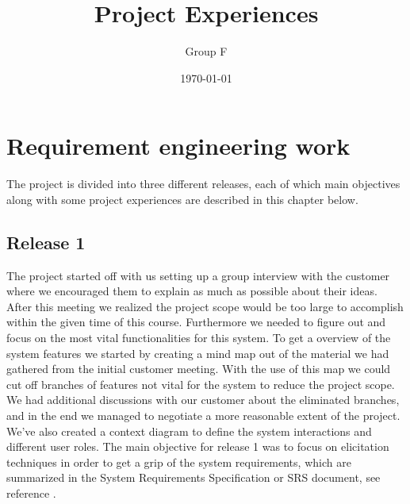\documentclass[10pt]{article}
\begin{document}
\makeatletter
\renewcommand{\@biblabel}[1]{\quad#1.}
\makeatother


\pagestyle{myheadings}





\begin{titlepage}
\title{Project Experiences}
\author{Group F}
\date{\today}
\maketitle
\thispagestyle{empty}
\end{titlepage}

\tableofcontents
\thispagestyle{empty}
\newpage
{}

\section{Requirement engineering work}
\noindent The project is divided into three different releases, each of which main objectives along with some project experiences are described in this chapter below.

\subsection{Release 1}
The project started off with us setting up a group interview with the customer where we encouraged them to explain as much as possible about their ideas. After this meeting we realized the project scope would be too large to accomplish within the given time of this course. Furthermore we needed to figure out and focus on the most vital functionalities for this system.
To get a overview of the system features we started by creating a mind map out of the material we had gathered from the initial customer meeting. With the use of this map we could cut off branches of features not vital for the system to reduce the project scope.
We had additional discussions with our customer about the eliminated branches, and in the end we managed to negotiate a more reasonable extent of the project.
\newline We've also created a context diagram to define the system interactions and different user roles.
The main objective for release 1 was to focus on elicitation techniques in order to get a grip of the system requirements, which are summarized in the System Requirements Specification or SRS document, see reference \cite{srs}.
\end{document}
